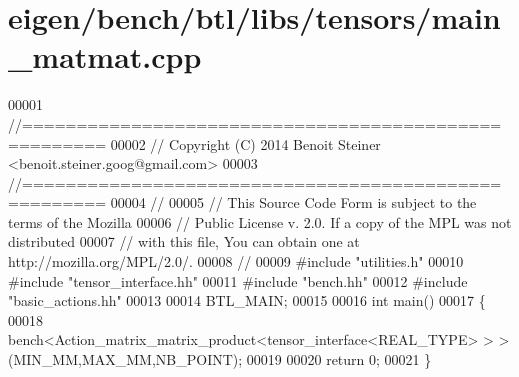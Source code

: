 \hypertarget{eigen_2bench_2btl_2libs_2tensors_2main__matmat_8cpp_source}{}\section{eigen/bench/btl/libs/tensors/main\+\_\+matmat.cpp}
\label{eigen_2bench_2btl_2libs_2tensors_2main__matmat_8cpp_source}

\begin{DoxyCode}
00001 \textcolor{comment}{//=====================================================}
00002 \textcolor{comment}{// Copyright (C) 2014 Benoit Steiner <benoit.steiner.goog@gmail.com>}
00003 \textcolor{comment}{//=====================================================}
00004 \textcolor{comment}{//}
00005 \textcolor{comment}{// This Source Code Form is subject to the terms of the Mozilla}
00006 \textcolor{comment}{// Public License v. 2.0. If a copy of the MPL was not distributed}
00007 \textcolor{comment}{// with this file, You can obtain one at http://mozilla.org/MPL/2.0/.}
00008 \textcolor{comment}{//}
00009 \textcolor{preprocessor}{#include "utilities.h"}
00010 \textcolor{preprocessor}{#include "tensor\_interface.hh"}
00011 \textcolor{preprocessor}{#include "bench.hh"}
00012 \textcolor{preprocessor}{#include "basic\_actions.hh"}
00013 
00014 BTL\_MAIN;
00015 
00016 \textcolor{keywordtype}{int} main()
00017 \{
00018   bench<Action\_matrix\_matrix\_product<tensor\_interface<REAL\_TYPE> > >(MIN\_MM,MAX\_MM,NB\_POINT);
00019 
00020   \textcolor{keywordflow}{return} 0;
00021 \}
\end{DoxyCode}
